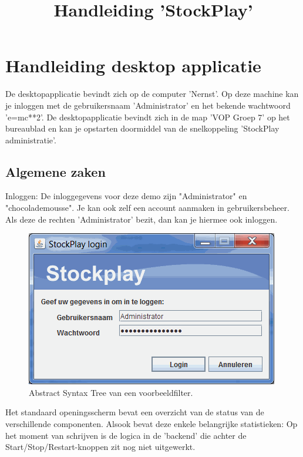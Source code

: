 \title{Handleiding 'StockPlay'}
\chapter{Handleiding desktop applicatie}

De desktopapplicatie bevindt zich op de computer 'Nernst'.
Op deze machine kan je inloggen met de gebruikersnaam 'Administrator' en het bekende wachtwoord 'e=mc**2'.
De desktopapplicatie bevindt zich in de map 'VOP Groep 7' op het bureaublad en kan je opstarten doormiddel van de snelkoppeling 'StockPlay administratie'.

\section{Algemene zaken}

Inloggen:
De inloggegevens voor deze demo zijn "Administrator" en "chocolademousse". Je kan ook zelf een account aanmaken in gebruikersbeheer. Als deze de rechten 'Administrator' bezit, dan kan je hiermee ook inloggen.

\begin{figure}[h!]
	\centering
		\includegraphics[width=\textwidth]{images/handleiding/handleiding1.gif}
	\caption{Abstract Syntax Tree van een voorbeeldfilter.}
\end{figure}

Het standaard openingsscherm bevat een overzicht van de status van de verschillende componenten.
Alsook bevat deze enkele belangrijke statistieken:
Op het moment van schrijven is de logica in de 'backend' die achter de Start/Stop/Restart-knoppen zit nog niet uitgewerkt.

